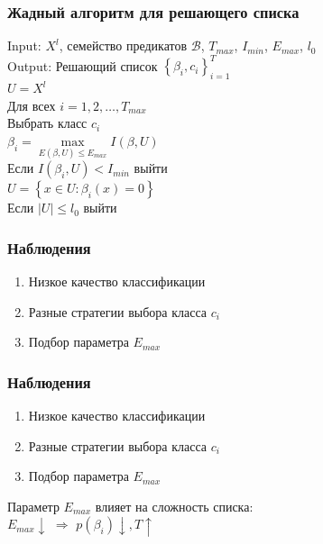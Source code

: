 \documentclass[12pt]{beamer}
\begin{document}
\begin{frame}\frametitle{Жадный алгоритм для решающего списка}
Input: $X^l$, семейство предикатов $\mathcal{B}$, $T_{max}$, $I_{min}$, $E_{max}$, $l_0$\\
Output: Решающий список $\left\{ \beta_i, c_i \right\}_{i=1}^T$\\
\vspace{5mm}
$U = X^l$\\
Для всех $i = 1,2,\dots,T_{max}$\\
\hspace{10mm} Выбрать класс $c_i$\\
\hspace{10mm} $\beta_i = \max\limits_{E(\beta, U) \leq E_{max}} I(\beta, U)$\\
\hspace{10mm} Если $I(\beta_i, U) < I_{min}$ выйти\\
\hspace{10mm} $U = \left\{ x \in U: \beta_i(x) = 0 \right\}$\\
\hspace{10mm} Если $\vert U \vert \leq l_0$ выйти
\end{frame}

\begin{frame}\frametitle{Наблюдения}
\begin{enumerate}[--]
\item Низкое качество классификации
\item Разные стратегии выбора класса $c_i$
\item Подбор параметра $E_{max}$
\end{enumerate}
\end{frame}

\begin{frame}\frametitle{Наблюдения}
\begin{enumerate}[--]
\item Низкое качество классификации
\item Разные стратегии выбора класса $c_i$
\item Подбор параметра $E_{max}$
\end{enumerate}
\vspace{5mm}
Параметр $E_{max}$ влияет на сложность списка:\\
$E_{max} \downarrow$ $\Rightarrow$ $p(\beta_i) \downarrow, T \uparrow$
\end{frame}
\end{document}
